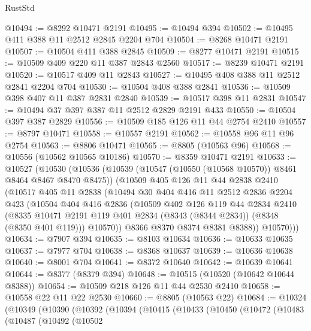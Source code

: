 \begin{lexlean}{RustStd}
\begin{coremodule}
@10494 := @8292 @10471 @2191
@10495 := @10494 @394
@10502 := @10495 @411 @388 @11 @2512 @2845 @2204 @704
@10504 := @8268 @10471 @2191
@10507 := @10504 @411 @388 @2845
@10509 := @8277 @10471 @2191
@10515 := @10509 @409 @220 @11 @387 @2843 @2560
@10517 := @8239 @10471 @2191
@10520 := @10517 @409 @11 @2843
@10527 := @10495 @408 @388 @11 @2512 @2841 @2204 @704
@10530 := @10504 @408 @388 @2841
@10536 := @10509 @398 @407 @11 @387 @2831 @2840
@10539 := @10517 @398 @11 @2831
@10547 := @10494 @37 @397 @387 @11 @2512 @2829 @2191 @433
@10550 := @10504 @397 @387 @2829
@10556 := @10509 @185 @126 @11 @44 @2754 @2410
@10557 := @8797 @10471
@10558 := @10557 @2191
@10562 := @10558 @96 @11 @96 @2754
@10563 := @8806 @10471
@10565 := @8805 (@10563 @96)
@10568 := @10556 (@10562 @10565 @10186)
@10570 := @8359 @10471 @2191
@10633 := @10527
    (@10530
      (@10536
        (@10539 (@10547 (@10550 (@10568 @10570)) @8461 @8464 @8467 @8470 @8475))
        (@10509
          @405
          @126
          @11
          @44
          @2838
          @2410
          (@10517
            @405
            @11
            @2838
            (@10494
              @30
              @404
              @416
              @11
              @2512
              @2836
              @2204
              @423
              (@10504
                @404
                @416
                @2836
                (@10509
                  @402
                  @126
                  @119
                  @44
                  @2834
                  @2410
                  (@8335
                    @10471
                    @2191
                    @119
                    @401
                    @2834
                    (@8343 (@8344 @2834))
                    (@8348 (@8350 @401 @119)))
                  @10570))
              @8366
              @8370
              @8374
              @8381
              @8388))
          @10570)))
@10634 := @7907 @394
@10635 := @8103 @10634
@10636 := @10633 @10635
@10637 := @7977 @704
@10638 := @8368 @10637
@10639 := @10636 @10638
@10640 := @8001 @704
@10641 := @8372 @10640
@10642 := @10639 @10641
@10644 := @8377 (@8379 @394)
@10648 := @10515 (@10520 (@10642 @10644 @8388))
@10654 := @10509 @218 @126 @11 @44 @2530 @2410
@10658 := @10558 @22 @11 @22 @2530
@10660 := @8805 (@10563 @22)
@10684 := @10324
    (@10349
      (@10390
        (@10392
          (@10394
            (@10415
              (@10433
                (@10450
                  (@10472
                    (@10483
                      (@10487
                        (@10492
                          (@10502

\end{coremodule}
\end{lexlean}

